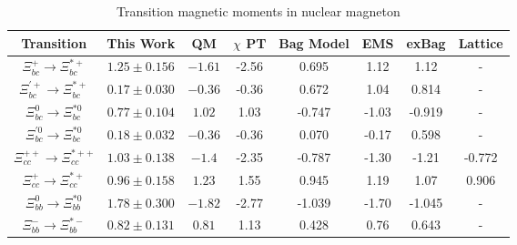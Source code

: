 \begin{table}[!ht]
    \centering
    \begin{tabular}{|c|c|c|c|c|c|c|c|}
        \hline
         Transition & This Work & QM\cite{transition15} & $\chi$ PT\cite{transition15} & Bag Model\cite{transition10} & EMS\cite{DhirEMS} & exBag\cite{exBag} & Lattice\cite{lattice} \\
         \hline
         $\Xi_{bc}^+\rightarrow\Xi_{bc}^{\ast+}$& $1.25\pm0.156$ & $-1.61$ & -2.56 & 0.695 &  1.12 & 1.12 & - \\
         \hline
         $\Xi_{bc}^{\prime+}\rightarrow\Xi_{bc}^{\ast+}$& $0.17\pm0.030$ & $-0.36$ & -0.36 & 0.672  & 1.04 & 0.814 & - \\
         \hline
         $\Xi_{bc}^0\rightarrow\Xi_{bc}^{\ast0}$& $0.77\pm0.104$ & $1.02$ &  1.03 & -0.747 & -1.03 & -0.919 & - \\
         \hline
         $\Xi_{bc}^{\prime0}\rightarrow\Xi_{bc}^{\ast0}$& $0.18\pm0.032$ & $-0.36$  & -0.36 & 0.070 & -0.17 & 0.598 & - \\
         \hline
         $\Xi_{cc}^{++}\rightarrow\Xi_{cc}^{\ast++}$& $1.03\pm0.138$ & $-1.4$  & -2.35 & -0.787 & -1.30 & -1.21 & -0.772\\
         \hline
         $\Xi_{cc}^+\rightarrow\Xi_{cc}^{\ast+}$& $0.96\pm0.158$ & $1.23$  & 1.55 & 0.945 & 1.19 & 1.07 & 0.906\\
         \hline
         $\Xi_{bb}^0\rightarrow\Xi_{bb}^{\ast0}$& $1.78\pm0.300$ & $-1.82$ & -2.77 & -1.039 & -1.70 & -1.045 & - \\
         \hline
         $\Xi_{bb}^-\rightarrow\Xi_{bb}^{\ast-}$& $0.82\pm0.131$ & $0.81$ & 1.13 & 0.428 & 0.76 & 0.643 & - \\
        \hline
    \end{tabular}
    \caption{Transition magnetic moments in nuclear magneton}
    \label{magnetic_results}
\end{table}
